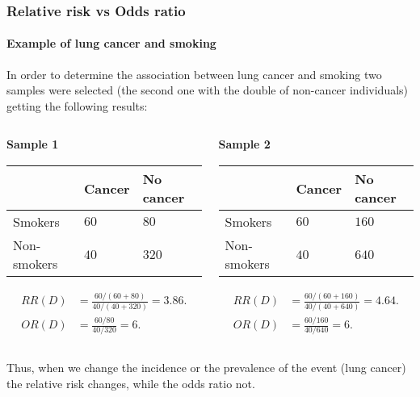 \begin{frame}
\frametitle{Relative risk vs Odds ratio}
\framesubtitle{Example of lung cancer and smoking}
In order to determine the association between lung cancer and smoking two samples were selected (the second one with the double of non-cancer individuals) getting the following results:

\bigskip
\begin{columns}
\begin{column}{0.5\textwidth}
\textbf{Sample 1}
\begin{center}
\small
\begin{tabular}{|m{1.9cm}|m{1.2cm}<{\centering}|m{1.5cm}<{\centering}|}
\cline{2-3}
\multicolumn{1}{c|}{} & Cancer & No cancer\\ 
\hline
Smokers & $60$ & $80$\\ 
\hline 
Non-smokers & $40$ & $320$\\ 
\hline
\end{tabular}
\end{center}

\begin{align*}
RR(D) &= \frac{60/(60+80)}{40/(40+320)} = 3.86.\\
OR(D) &= \frac{60/80}{40/320} = 6. 
\end{align*}
\end{column}
\begin{column}{0.5\textwidth}
\textbf{Sample 2}
\begin{center}
\small
\begin{tabular}{|m{1.9cm}|m{1.2cm}<{\centering}|m{1.5cm}<{\centering}|}
\cline{2-3}
\multicolumn{1}{c|}{} & Cancer & No cancer\\ 
\hline
Smokers & $60$ & $160$\\ 
\hline 
Non-smokers & $40$ & $640$\\ 
\hline
\end{tabular}
\end{center}

\begin{align*}
RR(D) &= \frac{60/(60+160)}{40/(40+640)} = 4.64.\\
OR(D) &= \frac{60/160}{40/640} = 6. 
\end{align*}
\end{column}
\end{columns}
Thus, when we change the incidence or the prevalence of the event (lung cancer) the relative risk changes, while the odds ratio not. 
\end{frame}



